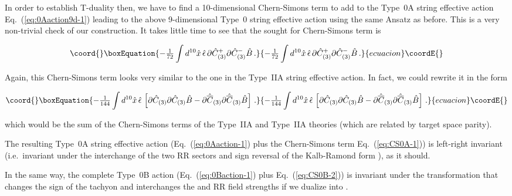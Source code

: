 \documentclass[12pt,a4paper]{article}
\begin{document}
In order to establish T-duality then, we have to find a
10-dimensional Chern-Simons term to add to the
Type~0A string effective action Eq.~(\ref{eq:0Aaction9d-1}) leading to
the above 9-dimensional Type~0 string effective action using the same
Ansatz as before. This is a very non-trivial check of our construction.
It takes little time to see that the sought for Chern-Simons term is

\begin{equation}\coord{}\boxEquation{
\label{eq:CS0A-1}
-{\textstyle\frac{1}{72}} \int d^{10}\hat{x}\, 
\hat{\epsilon}\,
\partial\hat{C}^{+}_{(3)}\partial\hat{C}^{-}_{(3)}\hat{B}\, .
}{
-{\textstyle\frac{1}{72}} \int d^{10}\hat{x}\, 
\hat{\epsilon}\,
\partial\hat{C}^{+}_{(3)}\partial\hat{C}^{-}_{(3)}\hat{B}\, .
}{ecuacion}\coordE{}\end{equation}

\noindent Again, this Chern-Simons term looks very similar to the one in the
Type~IIA string effective action. In fact, we could rewrite it in the
form

\begin{equation}\coord{}\boxEquation{
\label{eq:CS0A-2}
-{\textstyle\frac{1}{144}} \int d^{10}\hat{x}\, 
\hat{\epsilon}\,\left[
\partial\hat{C}_{(3)}\partial\hat{C}_{(3)}\hat{B}
-\partial\hat{\overline{C}}_{(3)}\partial\hat{\overline{C}}_{(3)}\hat{B}
\right]\, .
}{
-{\textstyle\frac{1}{144}} \int d^{10}\hat{x}\, 
\hat{\epsilon}\,\left[
\partial\hat{C}_{(3)}\partial\hat{C}_{(3)}\hat{B}
-\partial\hat{\overline{C}}_{(3)}\partial\hat{\overline{C}}_{(3)}\hat{B}
\right]\, .
}{ecuacion}\coordE{}\end{equation}

\noindent which would be the sum of the Chern-Simons terms of the 
Type~IIA\myHighlight{$_{+}$}\coordHE{} and Type~IIA\myHighlight{$_{-}$}\coordHE{} theories (which are related
by target space parity).  

The resulting Type~0A string effective action
(Eq.~(\ref{eq:0Aaction-1}) plus the Chern-Simons term
Eq.~(\ref{eq:CS0A-1})) is left-right invariant (i.e.~invariant under
the interchange of the two RR sectors \coordHE{} and sign reversal of the Kalb-Ramond form \coordHE{}), as it should.

In the same way, the complete Type~0B action
(Eq.~(\ref{eq:0Baction-1}) plus Eq.~(\ref{eq:CS0B-2})) is invariant
under the transformation that changes the sign of the tachyon and
interchanges the \myHighlight{$+$}\coordHE{} and \myHighlight{$-$}\coordHE{} RR field strengths if we dualize
\coordHE{} into \coordHE{}.
\end{document}
